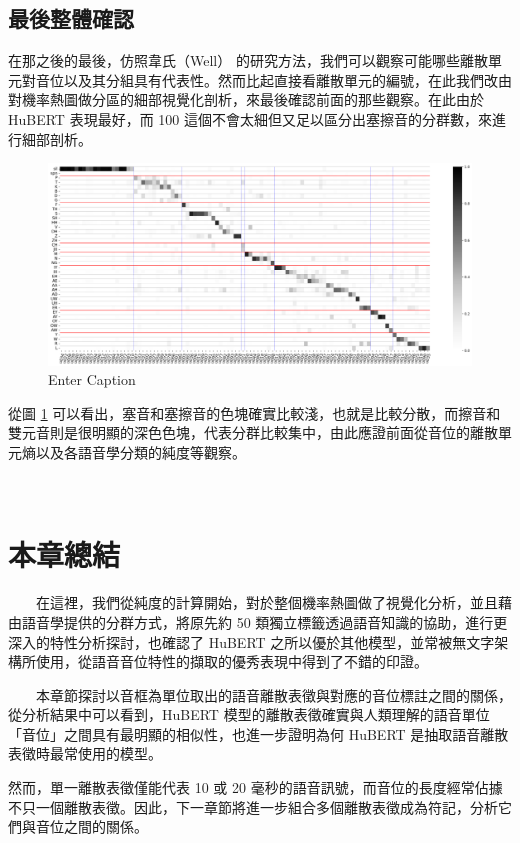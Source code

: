 {
}


\subsection{最後整體確認}


        在那之後的最後，仿照韋氏（Well） \cite{wells_phonetic_2022} 的研究方法，我們可以觀察可能哪些離散單元對音位以及其分組具有代表性。然而比起直接看離散單元的編號，在此我們改由對機率熱圖做分區的細部視覺化剖析，來最後確認前面的那些觀察。在此由於 HuBERT 表現最好，而 100 這個不會太細但又足以區分出塞擦音的分群數，來進行細部剖析。

\begin{figure}
    \centering
    \includegraphics[width=0.5\linewidth]{figures/sdfasdfasdfaqqqqqqqq.png}
    \caption{Enter Caption}
    \label{sdfasdfasdfaqqqqqqqq}
\end{figure}

        從圖 \ref{sdfasdfasdfaqqqqqqqq} 可以看出，塞音和塞擦音的色塊確實比較淺，也就是比較分散，而擦音和雙元音則是很明顯的深色色塊，代表分群比較集中，由此應證前面從音位的離散單元熵以及各語音學分類的純度等觀察。




{

\section{本章總結}


　　在這裡，我們從純度的計算開始，對於整個機率熱圖做了視覺化分析，並且藉由語音學提供的分群方式，將原先約 50 類獨立標籤透過語音知識的協助，進行更深入的特性分析探討，也確認了 HuBERT 之所以優於其他模型，並常被無文字架構所使用，從語音音位特性的擷取的優秀表現中得到了不錯的印證。



　　本章節探討以音框為單位取出的語音離散表徵與對應的音位標註之間的關係，從分析結果中可以看到，HuBERT 模型的離散表徵確實與人類理解的語音單位「音位」之間具有最明顯的相似性，也進一步證明為何 HuBERT 是抽取語音離散表徵時最常使用的模型。

        然而，單一離散表徵僅能代表 10 或 20 毫秒的語音訊號，而音位的長度經常佔據不只一個離散表徵。因此，下一章節將進一步組合多個離散表徵成為符記，分析它們與音位之間的關係。



}
